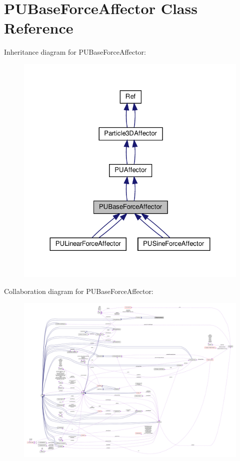 \hypertarget{classPUBaseForceAffector}{}\section{P\+U\+Base\+Force\+Affector Class Reference}
\label{classPUBaseForceAffector}


Inheritance diagram for P\+U\+Base\+Force\+Affector\+:
\nopagebreak
\begin{figure}[H]
\begin{center}
\leavevmode
\includegraphics[width=324pt]{classPUBaseForceAffector__inherit__graph}
\end{center}
\end{figure}


Collaboration diagram for P\+U\+Base\+Force\+Affector\+:
\nopagebreak
\begin{figure}[H]
\begin{center}
\leavevmode
\includegraphics[width=350pt]{classPUBaseForceAffector__coll__graph}
\end{center}
\end{figure}
